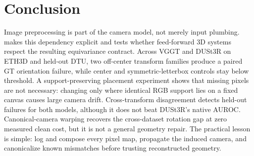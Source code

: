 \section{Conclusion}
\label{sec:conclusion}

Image preprocessing is part of the camera model, not merely input plumbing.
\method makes this dependency explicit and tests whether feed-forward 3D
systems respect the resulting equivariance contract.  Across VGGT and DUSt3R
on ETH3D and held-out DTU, two off-center transform families produce a paired
GT orientation failure, while center and symmetric-letterbox controls stay
below threshold.  A support-preserving placement experiment shows that missing
pixels are not necessary: changing only where identical RGB support lies on a
fixed canvas causes large camera drift.  Cross-transform disagreement detects
held-out failures for both models, although it does not beat DUSt3R's native
AUROC.  Canonical-camera warping recovers the cross-dataset rotation gap at zero
measured clean cost, but it is not a general geometry repair.  The practical
lesson is simple: log and compose every pixel map, propagate the induced camera,
and canonicalize known mismatches before trusting reconstructed geometry.

